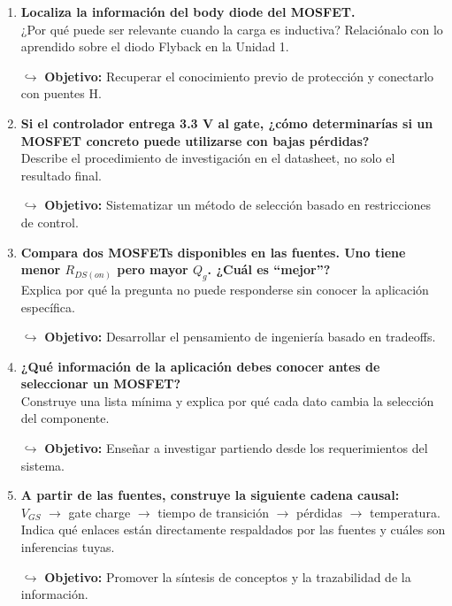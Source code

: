 \documentclass[11pt, a4paper]{article}
\begin{document}
\begin{enumerate}[label=\textbf{\arabic*.}, leftmargin=*, itemsep=12pt]
    \item \textbf{Localiza la información del body diode del MOSFET.}\\
    ¿Por qué puede ser relevante cuando la carga es inductiva? Relaciónalo con lo aprendido sobre el diodo Flyback en la Unidad 1.
    \par\vspace{2pt}\textcolor{objgray}{\small $\hookrightarrow$ \textbf{Objetivo:} Recuperar el conocimiento previo de protección y conectarlo con puentes H.}

    \item \textbf{Si el controlador entrega 3.3 V al gate, ¿cómo determinarías si un MOSFET concreto puede utilizarse con bajas pérdidas?}\\
    Describe el procedimiento de investigación en el datasheet, no solo el resultado final.
    \par\vspace{2pt}\textcolor{objgray}{\small $\hookrightarrow$ \textbf{Objetivo:} Sistematizar un método de selección basado en restricciones de control.}

    \item \textbf{Compara dos MOSFETs disponibles en las fuentes. Uno tiene menor $R_{DS(on)}$ pero mayor $Q_g$. ¿Cuál es ``mejor''?}\\
    Explica por qué la pregunta no puede responderse sin conocer la aplicación específica.
    \par\vspace{2pt}\textcolor{objgray}{\small $\hookrightarrow$ \textbf{Objetivo:} Desarrollar el pensamiento de ingeniería basado en tradeoffs.}

    \item \textbf{¿Qué información de la aplicación debes conocer antes de seleccionar un MOSFET?}\\
    Construye una lista mínima y explica por qué cada dato cambia la selección del componente.
    \par\vspace{2pt}\textcolor{objgray}{\small $\hookrightarrow$ \textbf{Objetivo:} Enseñar a investigar partiendo desde los requerimientos del sistema.}

    \item \textbf{A partir de las fuentes, construye la siguiente cadena causal:}\\
    $V_{GS}$ $\rightarrow$ gate charge $\rightarrow$ tiempo de transición $\rightarrow$ pérdidas $\rightarrow$ temperatura. Indica qué enlaces están directamente respaldados por las fuentes y cuáles son inferencias tuyas.
    \par\vspace{2pt}\textcolor{objgray}{\small $\hookrightarrow$ \textbf{Objetivo:} Promover la síntesis de conceptos y la trazabilidad de la información.}

\end{enumerate}
\end{document}
